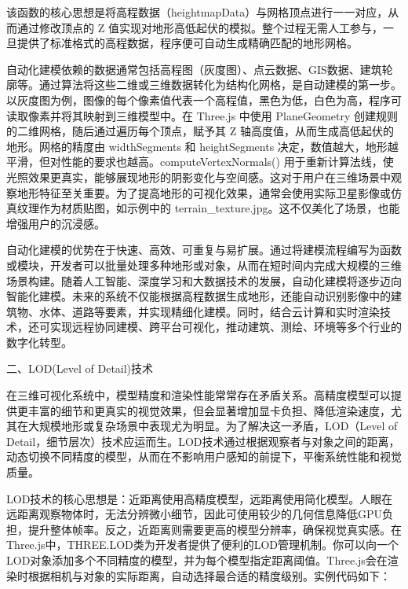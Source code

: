 该函数的核心思想是将高程数据（heightmapData）与网格顶点进行一一对应，从而通过修改顶点的 Z 值实现对地形高低起伏的模拟。整个过程无需人工参与，一旦提供了标准格式的高程数据，程序便可自动生成精确匹配的地形网格。

自动化建模依赖的数据通常包括高程图（灰度图）、点云数据、GIS数据、建筑轮廓等。通过算法将这些二维或三维数据转化为结构化网格，是自动建模的第一步。以灰度图为例，图像的每个像素值代表一个高程值，黑色为低，白色为高，程序可读取像素并将其映射到三维模型中。在 Three.js 中使用 PlaneGeometry 创建规则的二维网格，随后通过遍历每个顶点，赋予其 Z 轴高度值，从而生成高低起伏的地形。网格的精度由 widthSegments 和 heightSegments 决定，数值越大，地形越平滑，但对性能的要求也越高。computeVertexNormals() 用于重新计算法线，使光照效果更真实，能够展现地形的阴影变化与空间感。这对于用户在三维场景中观察地形特征至关重要。为了提高地形的可视化效果，通常会使用实际卫星影像或仿真纹理作为材质贴图，如示例中的 terrain\_texture.jpg。这不仅美化了场景，也能增强用户的沉浸感。

自动化建模的优势在于快速、高效、可重复与易扩展。通过将建模流程编写为函数或模块，开发者可以批量处理多种地形或对象，从而在短时间内完成大规模的三维场景构建。随着人工智能、深度学习和大数据技术的发展，自动化建模将逐步迈向智能化建模。未来的系统不仅能根据高程数据生成地形，还能自动识别影像中的建筑物、水体、道路等要素，并实现精细化建模。同时，结合云计算和实时渲染技术，还可实现远程协同建模、跨平台可视化，推动建筑、测绘、环境等多个行业的数字化转型。

二、LOD(Level of Detail)技术

在三维可视化系统中，模型精度和渲染性能常常存在矛盾关系。高精度模型可以提供更丰富的细节和更真实的视觉效果，但会显著增加显卡负担、降低渲染速度，尤其在大规模地形或复杂场景中表现尤为明显。为了解决这一矛盾，LOD（Level of Detail，细节层次）技术应运而生。LOD技术通过根据观察者与对象之间的距离，动态切换不同精度的模型，从而在不影响用户感知的前提下，平衡系统性能和视觉质量。

LOD技术的核心思想是：近距离使用高精度模型，远距离使用简化模型。人眼在远距离观察物体时，无法分辨微小细节，因此可使用较少的几何信息降低GPU负担，提升整体帧率。反之，近距离则需要更高的模型分辨率，确保视觉真实感。在Three.js中，THREE.LOD类为开发者提供了便利的LOD管理机制。你可以向一个LOD对象添加多个不同精度的模型，并为每个模型指定距离阈值。Three.js会在渲染时根据相机与对象的实际距离，自动选择最合适的精度级别。实例代码如下：

